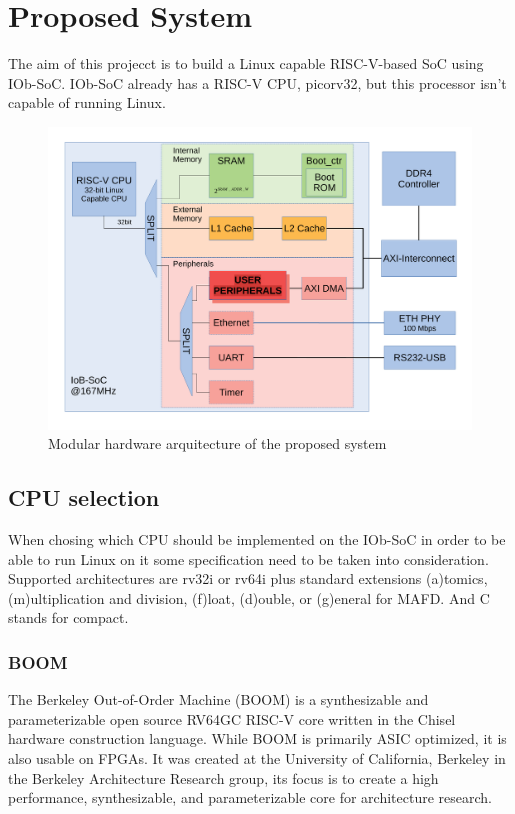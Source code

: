 \chapter{Proposed System}
\label{chapter:proposed system}
\quad The aim of this projecct is to build a Linux capable RISC-V-based SoC using IOb-SoC. IOb-SoC already has a RISC-V CPU, picorv32, but this processor isn't capable of running Linux.
\begin{figure}
  \includegraphics{Figures/bd.pdf}
  \caption{Modular hardware arquitecture of the proposed system}
  \label{fig: IOb-SoC modules}
\end{figure}

\section{CPU selection}
\quad When chosing which CPU should be implemented on the IOb-SoC in order to be able to run Linux on it some specification need to be taken into consideration.
Supported architectures are rv32i or rv64i plus standard extensions (a)tomics, (m)ultiplication and division, (f)loat, (d)ouble, or (g)eneral for MAFD. And C stands for compact.

\subsection{BOOM}
\quad The Berkeley Out-of-Order Machine (BOOM) is a synthesizable and parameterizable open source RV64GC RISC-V core written in the Chisel hardware construction language. While BOOM is primarily ASIC optimized, it is also usable on FPGAs. It was created at the University of California, Berkeley in the Berkeley Architecture Research group, its focus is to create a high performance, synthesizable, and parameterizable core for architecture research.

